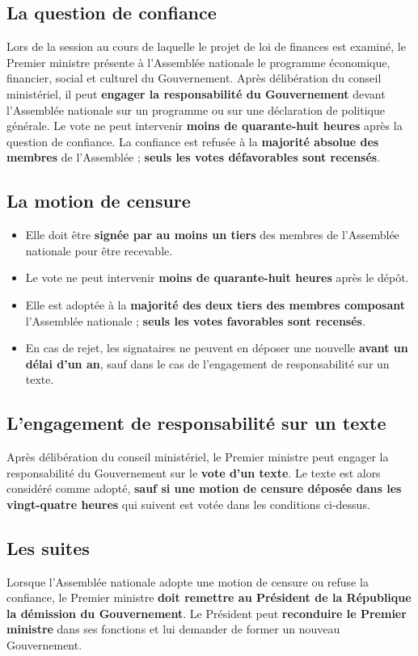 \documentclass[11pt,a4paper,oneside]{report}
\begin{document}
\subsection{La question de confiance}
Lors de la session au cours de laquelle le projet de loi de finances est examiné, le Premier ministre présente à l'Assemblée nationale le programme économique, financier, social et culturel du Gouvernement. Après délibération du conseil ministériel, il peut \textbf{engager la responsabilité du Gouvernement} devant l'Assemblée nationale sur un programme ou sur une déclaration de politique générale. Le vote ne peut intervenir \textbf{moins de quarante-huit heures} après la question de confiance. La confiance est refusée à la \textbf{majorité absolue des membres} de l'Assemblée ; \textbf{seuls les votes défavorables sont recensés}.

\subsection{La motion de censure}
\begin{itemize}
  \item Elle doit être \textbf{signée par au moins un tiers} des membres de l'Assemblée nationale pour être recevable.
  \item Le vote ne peut intervenir \textbf{moins de quarante-huit heures} après le dépôt.
  \item Elle est adoptée à la \textbf{majorité des deux tiers des membres composant} l'Assemblée nationale ; \textbf{seuls les votes favorables sont recensés}.
  \item En cas de rejet, les signataires ne peuvent en déposer une nouvelle \textbf{avant un délai d'un an}, sauf dans le cas de l'engagement de responsabilité sur un texte.
\end{itemize}
\subsection{L'engagement de responsabilité sur un texte}
Après délibération du conseil ministériel, le Premier ministre peut engager la responsabilité du Gouvernement sur le \textbf{vote d'un texte}. Le texte est alors considéré comme adopté, \textbf{sauf si une motion de censure déposée dans les vingt-quatre heures} qui suivent est votée dans les conditions ci-dessus.

\subsection{Les suites}
Lorsque l'Assemblée nationale adopte une motion de censure ou refuse la confiance, le Premier ministre \textbf{doit remettre au Président de la République la démission du Gouvernement}. Le Président peut \textbf{reconduire le Premier ministre} dans ses fonctions et lui demander de former un nouveau Gouvernement.
\end{document}
